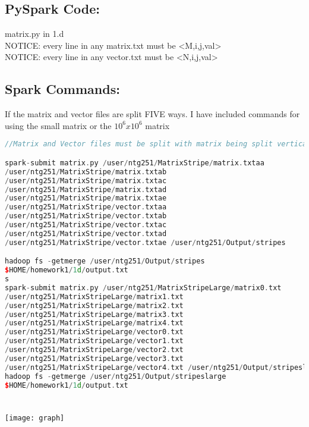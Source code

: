 \subsection*{PySpark Code:}
matrix.py in 1.d
\\
NOTICE: every line in any matrix.txt must be <M,i,j,val>
\\
NOTICE: every line in any vector.txt must be <N,i,j,val>

\subsection*{Spark Commands:}
If the matrix and vector files are split FIVE ways. I have included commands for using the small matrix or the $10^6x10^6$ matrix
\begin{lstlisting}[language=c++]
//Matrix and Vector files must be split with matrix being split vertically and vector being split horizontally

spark-submit matrix.py /user/ntg251/MatrixStripe/matrix.txtaa 
/user/ntg251/MatrixStripe/matrix.txtab 
/user/ntg251/MatrixStripe/matrix.txtac 
/user/ntg251/MatrixStripe/matrix.txtad 
/user/ntg251/MatrixStripe/matrix.txtae 
/user/ntg251/MatrixStripe/vector.txtaa 
/user/ntg251/MatrixStripe/vector.txtab 
/user/ntg251/MatrixStripe/vector.txtac 
/user/ntg251/MatrixStripe/vector.txtad 
/user/ntg251/MatrixStripe/vector.txtae /user/ntg251/Output/stripes

hadoop fs -getmerge /user/ntg251/Output/stripes 
$HOME/homework1/1d/output.txt
s
spark-submit matrix.py /user/ntg251/MatrixStripeLarge/matrix0.txt
/user/ntg251/MatrixStripeLarge/matrix1.txt 
/user/ntg251/MatrixStripeLarge/matrix2.txt 
/user/ntg251/MatrixStripeLarge/matrix3.txt 
/user/ntg251/MatrixStripeLarge/matrix4.txt 
/user/ntg251/MatrixStripeLarge/vector0.txt 
/user/ntg251/MatrixStripeLarge/vector1.txt 
/user/ntg251/MatrixStripeLarge/vector2.txt 
/user/ntg251/MatrixStripeLarge/vector3.txt 
/user/ntg251/MatrixStripeLarge/vector4.txt /user/ntg251/Output/stripeslarge
hadoop fs -getmerge /user/ntg251/Output/stripeslarge 
$HOME/homework1/1d/output.txt
\end{lstlisting}

\section*{}
\texttt{[image: graph]}


